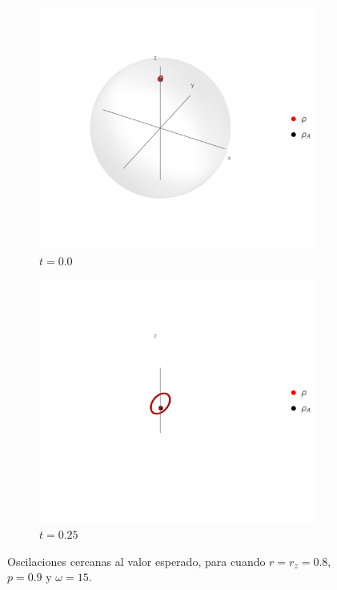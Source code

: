 \begin{figure}[h!]
    \centering
    \begin{subfigure}{0.5\textwidth}
      \centering
      \includegraphics[width=0.9\linewidth]{chapter3/figures_separable/U1xU2_H1=(sz)_H2=15(sx-sy)_z=0.8_p=0.9_far.png}
      \caption{$t=0.0$}
    \end{subfigure}%
    \begin{subfigure}{0.5\textwidth}
      \centering
      \includegraphics[width=0.9\linewidth]{chapter3/figures_separable/U1xU2_H1=(sz)_H2=15(sx-sy)_z=0.8_p=0.9.png}
      \caption{$t=0.25$}
    \end{subfigure}
    \caption{Oscilaciones cercanas al valor esperado, para cuando $r=r_{z}=0.8$, $p=0.9$ y $\omega=15$. }\label{fig:EvolutionOscilations}
\end{figure}

